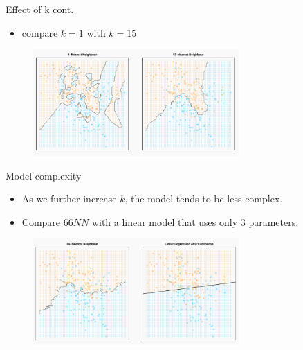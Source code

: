 \documentclass[serif, aspectratio=169]{beamer}
\begin{document}
\begin{frame}{Effect of k cont.}
    \begin{itemize}
        \item compare $k=1$ with $k=15$
    \end{itemize}
    \begin{figure}[h]
            \centering
            
            \includegraphics[width=0.7\textwidth]{pic/1vs15.png}
            \end{figure}
    
\end{frame}
\begin{frame}{Model complexity}
    \begin{itemize}
        \item As we further increase $k$, the model tends to be less complex.
        \item Compare $66NN$ with a linear model that uses only $3$ parameters:
    \end{itemize}
    
    \begin{figure}[h]
            \centering
            
            \includegraphics[width=0.7\textwidth]{pic/66vsLin.png}
            \end{figure}
            
    \vfill
\end{frame}
\end{document}
